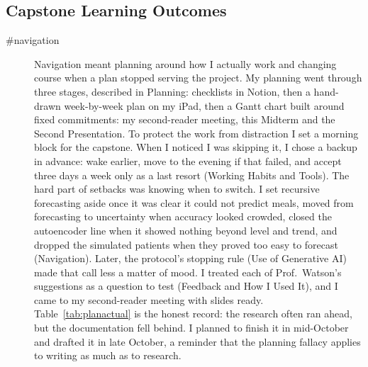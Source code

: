 \subsection{Capstone Learning Outcomes}

\begin{description}
\item[\#navigation] Navigation meant planning around how I actually work and changing course when a plan stopped serving the project. My planning went through three stages, described in Planning: checklists in Notion, then a hand-drawn week-by-week plan on my iPad, then a Gantt chart built around fixed commitments: my second-reader meeting, this Midterm and the Second Presentation. To protect the work from distraction I set a morning block for the capstone. When I noticed I was skipping it, I chose a backup in advance: wake earlier, move to the evening if that failed, and accept three days a week only as a last resort (Working Habits and Tools). The hard part of setbacks was knowing when to switch. I set recursive forecasting aside once it was clear it could not predict meals, moved from forecasting to uncertainty when accuracy looked crowded, closed the autoencoder line when it showed nothing beyond level and trend, and dropped the simulated patients when they proved too easy to forecast (Navigation). Later, the protocol's stopping rule (Use of Generative AI) made that call less a matter of mood. I treated each of Prof.\ Watson's suggestions as a question to test (Feedback and How I Used It), and I came to my second-reader meeting with slides ready. Table~\ref{tab:planactual} is the honest record: the research often ran ahead, but the documentation fell behind. I planned to finish it in mid-October and drafted it in late October, a reminder that the planning fallacy applies to writing as much as to research.


\end{description}
